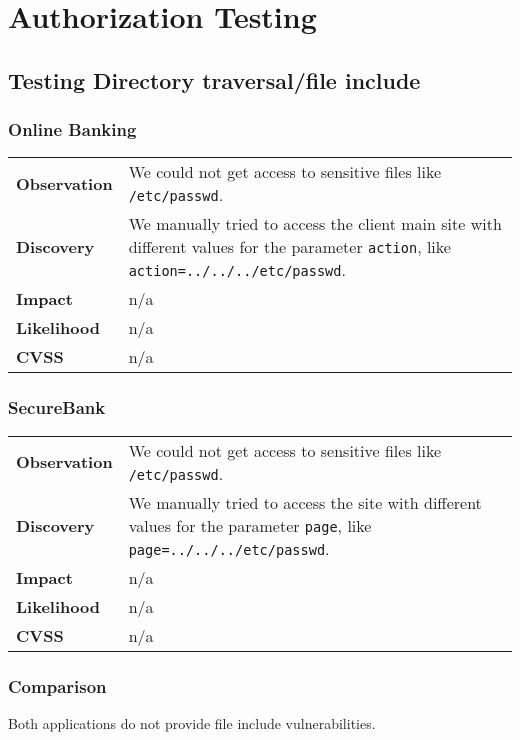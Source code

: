 \clearpage

\section{Authorization Testing}

\subsection{Testing Directory traversal/file include}

\subsubsection*{Online Banking}

\begin{tabular}{l|p{10cm}}

\textbf{Observation} & We could not get access to sensitive files like \texttt{/etc/passwd}. \\
\textbf{Discovery} & We manually tried to access the client main site with different values for the parameter \texttt{action}, like \texttt{action=../../../etc/passwd}. \\
\textbf{Impact} & n/a \\
\textbf{Likelihood} & n/a \\
\textbf{CVSS} & n/a \\
\end{tabular}

\subsubsection*{SecureBank}

\begin{tabular}{l|p{10cm}}

\textbf{Observation} & We could not get access to sensitive files like \texttt{/etc/passwd}. \\
\textbf{Discovery} & We manually tried to access the site with different values for the parameter \texttt{page}, like \texttt{page=../../../etc/passwd}. \\
\textbf{Impact} & n/a \\
\textbf{Likelihood} & n/a \\
\textbf{CVSS} & n/a \\
\end{tabular}

\subsubsection*{Comparison}
Both applications do not provide file include vulnerabilities.


